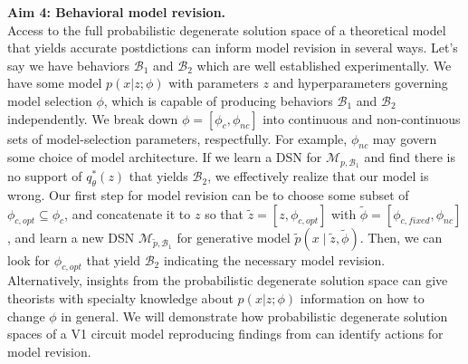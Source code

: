 \documentclass[11pt]{article}
\begin{document}
\textbf{Aim 4: Behavioral model revision.} \\
Access to the full probabilistic degenerate solution space of a theoretical model that yields accurate postdictions can inform model revision in several ways.  Let’s say we have behaviors $\mathcal{B}_1$ and $\mathcal{B}_2$ which are well established experimentally.  We have some model $p(x | z; \phi)$ with parameters $z$ and hyperparameters governing model selection $\phi$, which is capable of producing behaviors $\mathcal{B}_1$ and $\mathcal{B}_2$ independently.  We break down $\phi = \left[\phi_c, \phi_{nc} \right]$ into continuous and non-continuous sets of model-selection parameters, respectfully.  For example, $\phi_{nc}$ may govern some choice of model architecture.  If we learn a DSN for $\mathcal{M}_{p,\mathcal{B}_1}$ and find there is no support of $q_{\theta}^*(z)$ that yields $\mathcal{B}_2$, we effectively realize that our model is wrong.  Our first step for model revision can be to choose some subset of $\phi_{c,opt} \subseteq \phi_c$, and concatenate it to $z$ so that $\tilde{z} = [z, \phi_{c,opt}]$ with $\tilde{\phi} = \left[ \phi_{c,fixed}, \phi_{nc} \right]$, and learn a new DSN $\mathcal{M}_{\tilde{p}, \mathcal{B}_1}$ for generative model $\tilde{p}(x \mid \tilde{z}, \tilde{\phi})$.  Then, we can look for $\phi_{c,opt}$ that yield $\mathcal{B}_2$ indicating the necessary model revision.  Alternatively, insights from the probabilistic degenerate solution space can give theorists with specialty knowledge about $p(x | z; \phi)$ information on how to change $\phi$ in general.  We will demonstrate how probabilistic degenerate solution spaces of a V1 circuit model reproducing findings from \cite{dipoppa2018vision} can identify actions for model revision.



\end{document}
